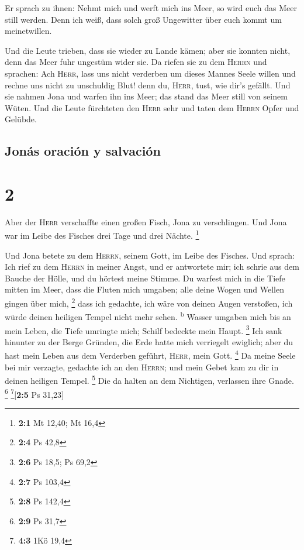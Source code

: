  Er sprach zu ihnen: Nehmt mich und werft mich ins Meer,
so wird euch das Meer still werden. Denn ich weiß, dass solch groß
Ungewitter über euch kommt um meinetwillen.

 Und die Leute trieben, dass sie wieder zu Lande kämen;
aber sie konnten nicht, denn das Meer fuhr ungestüm wider sie.
 Da riefen sie zu dem \textsc{Herrn} und sprachen: Ach
\textsc{Herr}, lass uns nicht verderben um dieses Mannes Seele willen
und rechne uns nicht zu unschuldig Blut! denn du, \textsc{Herr}, tust,
wie dir's gefällt.  Und sie nahmen Jona und warfen ihn
ins Meer; das stand das Meer still von seinem Wüten.  Und
die Leute fürchteten den \textsc{Herr} sehr und taten dem \textsc{Herrn}
Opfer und Gelübde.

\hypertarget{jonuxe1s-oraciuxf3n-y-salvaciuxf3n}{%
\subsection{Jonás oración y
salvación}\label{jonuxe1s-oraciuxf3n-y-salvaciuxf3n}}

\hypertarget{section-1}{%
\section{2}\label{section-1}}

 Aber der \textsc{Herr} verschaffte einen großen Fisch,
Jona zu verschlingen. Und Jona war im Leibe des Fisches drei Tage und
drei Nächte. \footnote{\textbf{2:1} Mt 12,40; Mt 16,4}

 Und Jona betete zu dem \textsc{Herrn}, seinem Gott, im
Leibe des Fisches.  Und sprach: Ich rief zu dem
\textsc{Herrn} in meiner Angst, und er antwortete mir; ich schrie aus
dem Bauche der Hölle, und du hörtest meine Stimme.  Du
warfest mich in die Tiefe mitten im Meer, dass die Fluten mich umgaben;
alle deine Wogen und Wellen gingen über mich, \footnote{\textbf{2:4} Ps
  42,8}  dass ich gedachte, ich wäre von deinen Augen
verstoßen, ich würde deinen heiligen Tempel nicht mehr sehen.
\textsuperscript{b}  Wasser umgaben mich bis an mein
Leben, die Tiefe umringte mich; Schilf bedeckte mein Haupt. \footnote{\textbf{2:6}
  Ps 18,5; Ps 69,2}  Ich sank hinunter zu der Berge
Gründen, die Erde hatte mich verriegelt ewiglich; aber du hast mein
Leben aus dem Verderben geführt, \textsc{Herr}, mein Gott. \footnote{\textbf{2:7}
  Ps 103,4}  Da meine Seele bei mir verzagte, gedachte ich
an den \textsc{Herrn}; und mein Gebet kam zu dir in deinen heiligen
Tempel. \footnote{\textbf{2:8} Ps 142,4}  Die da halten an
dem Nichtigen, verlassen ihre Gnade. \footnote{\textbf{2:9} Ps 31,7}
\footnote{\textbf{4:3} 1Kö 19,4}{[}\textbf{2:5} Ps 31,23{]}

